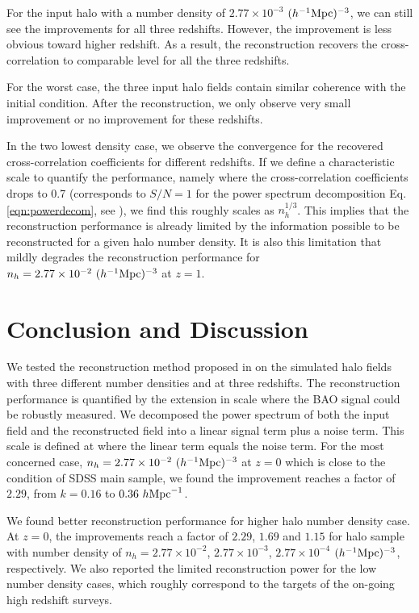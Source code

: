 \documentclass[iop]{emulateapj}
\newcommand{\mpch}{h^{-1} {\rm Mpc}}
\newcommand{\hmpc}{h {\rm Mpc}^{-1}}
\begin{document}
{For the input halo with a number density of $2.77\times 10^{-3}$ $(\mpch)^{-3}$, we can still see the improvements for all three redshifts.
However, the improvement is less obvious toward higher redshift.
As a result, the reconstruction recovers the cross-correlation to comparable level for all the three redshifts.

For the worst case, the three input halo fields contain similar coherence with the initial condition.
After the reconstruction, we only observe very small improvement or no improvement for these redshifts.

In the two lowest density case, we observe the convergence for the recovered cross-correlation coefficients for different redshifts.
If we define a characteristic scale to quantify the performance, namely where the cross-correlation coefficients drops to 0.7 (corresponds to $S/N=1$ for the power spectrum decomposition Eq. \ref{eqn:powerdecom}, see \cite{zhuhm16a}),   
we find this roughly scales as $n_h^{1/3}$.
This implies that the reconstruction performance is already limited by the information possible to be reconstructed for a given halo number density.
It is also this limitation that mildly degrades the reconstruction performance for $n_h=2.77\times 10^{-2}\ (\mpch)^{-3}$ at $z=1$.



\section{Conclusion and Discussion}
\label{sec:conclusion}

We tested the reconstruction method proposed in \citet{zhuhm16c} on the simulated halo fields with three different number densities and at three redshifts.
The reconstruction performance is quantified by the extension in scale where the BAO signal could be robustly measured.
We decomposed the power spectrum of both the input field and the reconstructed field into a linear signal term plus a noise term.
This scale is defined at where the linear term equals the noise term.
For the most concerned case, $n_h=2.77\times 10^{-2}\ (\mpch)^{-3}$ at $z=0$ which is close to the condition of SDSS main sample, we found the improvement reaches a factor of $2.29$, from $k=0.16$ to $0.36\ \hmpc$.

We found better reconstruction performance for higher halo number density case.
At $z=0$, the improvements reach a factor of $2.29$, $1.69$ and $1.15$ for halo sample with number density of $n_h=2.77\times 10^{-2}$, $2.77\times 10^{-3}$, $2.77\times 10^{-4}$ $(\mpch)^{-3}$, respectively.
We also reported the limited reconstruction power for the low number density cases, which roughly correspond to the targets of the on-going high redshift surveys.

}
\end{document}
